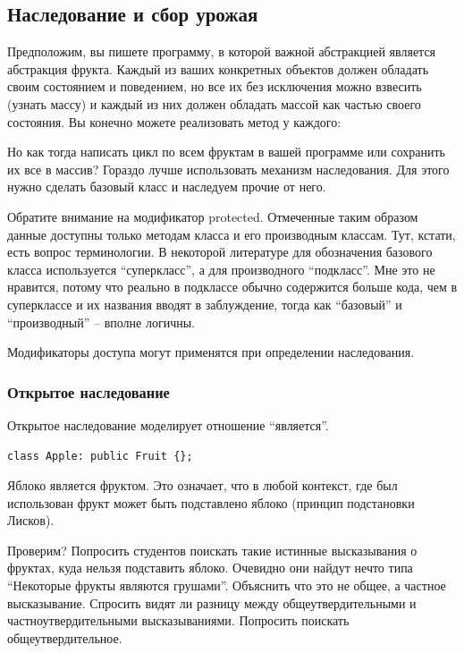 \documentclass[a4paper,12pt,oneside]{article}
\begin{document}
\subsection{Наследование и сбор урожая}

Предположим, вы пишете программу, в которой важной абстракцией является абстракция фрукта. Каждый из ваших конкретных объектов должен обладать своим состоянием и поведением, но все их без исключения можно взвесить (узнать массу) и каждый из них должен обладать массой как частью своего состояния. Вы конечно можете реализовать метод у каждого:



Но как тогда написать цикл по всем фруктам в вашей программе или сохранить их все в массив? Гораздо лучше использовать механизм наследования. Для этого нужно сделать базовый класс и наследуем прочие от него.



Обратите внимание на модификатор protected. Отмеченные таким образом данные доступны только методам класса и его производным классам. Тут, кстати, есть вопрос терминологии. В некоторой литературе для обозначения базового класса используется ``суперкласс'', а для производного ``подкласс''. Мне это не нравится, потому что реально в подклассе обычно содержится больше кода, чем в суперклассе и их названия вводят в заблуждение, тогда как ``базовый'' и ``производный'' – вполне логичны.

Модификаторы доступа могут применятся при определении наследования.

\subsubsection{Открытое наследование}

Открытое наследование моделирует отношение ``является''.

\begin{lstlisting}
class Apple: public Fruit {};
\end{lstlisting}

Яблоко является фруктом. Это означает, что в любой контекст, где был использован фрукт может быть подставлено яблоко (принцип подстановки Лисков).

Проверим? Попросить студентов поискать  такие истинные высказывания о фруктах, куда нельзя подставить яблоко. Очевидно они найдут нечто типа ``Некоторые фрукты являются грушами''. Объяснить что это не общее, а частное высказывание. Спросить видят ли разницу между общеутвердительными и частноутвердительными высказываниями. Попросить поискать общеутвердительное.
\end{document}
